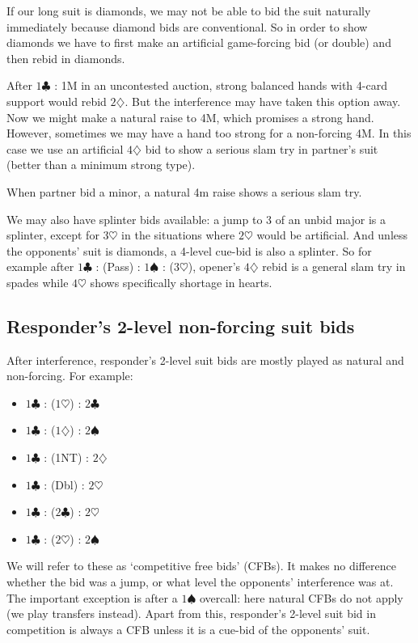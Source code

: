 \documentclass{article}
\newcommand{\sz}{\spadesuit}
\newcommand{\hz}{\heartsuit}
\newcommand{\dz}{\diamondsuit}
\newcommand{\cz}{\clubsuit}
\begin{document}
\begin{description}
If our long suit is diamonds, we may not be able to bid the suit naturally immediately because diamond bids are conventional. So in order to show diamonds we have to first make an artificial game-forcing bid (or double) and then rebid in diamonds.

\item[With 4-card support.] After $1\cz$ : 1M in an uncontested auction, strong balanced hands with 4-card support would rebid $2\dz$. But the interference may have taken this option away. Now we might make a natural raise to 4M, which promises a strong hand. However, sometimes we may have a hand too strong for a non-forcing 4M. In this case we use an artificial $4\dz$ bid to show a serious slam try in partner's suit (better than a minimum strong type).

When partner bid a minor, a natural 4m raise shows a serious slam try.

We may also have splinter bids available: a jump to 3 of an unbid major is a splinter, except for $3\hz$ in the situations where $2\hz$ would be artificial. And unless the opponents' suit is diamonds, a 4-level cue-bid is also a splinter. So for example after $1\cz$ : (Pass) : $1\sz$ : ($3\hz$), opener's $4\dz$ rebid is a general slam try in spades while $4\hz$ shows specifically shortage in hearts.
\end{description}

\subsection{Responder's 2-level non-forcing suit bids}

After interference, responder's 2-level suit bids are mostly played as natural and non-forcing. For example:

\begin{itemize}
\item $1\cz$ : ($1\hz$) : $2\cz$
\item $1\cz$ : ($1\dz$) : $2\sz$
\item $1\cz$ : (1NT) : $2\dz$
\item $1\cz$ : (Dbl) : $2\hz$
\item $1\cz$ : ($2\cz$) : $2\hz$
\item $1\cz$ : ($2\hz$) : $2\sz$
\end{itemize}
We will refer to these as `competitive free bids' (CFBs). It makes no difference whether the bid was a jump, or what level the opponents' interference was at. The important exception is after a $1\sz$ overcall: here natural CFBs do not apply (we play transfers instead). Apart from this, responder's 2-level suit bid in competition is always a CFB unless it is a cue-bid of the opponents' suit.
\end{document}
